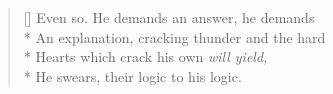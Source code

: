 \label{ch:lear_bh}
\settowidth{\versewidth}{An explanation, cracking thunder and the hard}
\begin{verse}[\versewidth]
 Even so. He demands an answer, he demands\\*
An explanation, cracking thunder and the hard\\*
Hearts which crack his own \textit{will yield,}\\*
He swears, their logic to his logic.
\end{verse}
